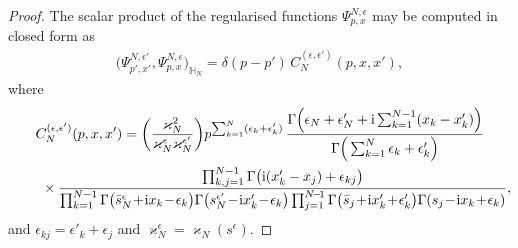 \begin{proof}
The scalar product of the regularised functions $\Psi^{N,\epsilon}_{p,{x}}$ may be computed in closed form as~\cite{Derkachov:2002tf}
\begin{gather*}
\big(\Psi^{N,\epsilon'}_{p',{x}'},\Psi^{N,\epsilon}_{p,{x}}\big)_{\mathbb H_N}=\delta(p-p') \, C_N^{(\epsilon, \epsilon')}(p, x, x'),
\end{gather*}
where
\begin{gather}
C_N^{( \epsilon, \epsilon')}(p, x, x') =\bigg(\frac{\varkappa_N^2}{\varkappa^{\epsilon}_N\varkappa^{\epsilon'}_N}\bigg)
p^{\sum_{k=1}^N(\epsilon_k+\epsilon'_k)} \,
\frac{\Gamma\Big(\epsilon_N+\epsilon'_N+{\rm i}\sum_{k=1}^{N-1}(x_k-x'_k)\Big)} {\Gamma\Big(\sum_{k=1}^N\epsilon_k+\epsilon'_k\Big)}\nonumber
\\ \qquad\
{}\times \frac{\prod_{k,j=1}^{N-1}\Gamma\big({\rm i}(x'_k-x_j)+\epsilon_{kj}\big)}
{\prod_{k=1}^{N-1}\Gamma\big( \bar s^\epsilon_N\!+\!{\rm i}x_k\!-\!\epsilon_k\big)
\Gamma\big(s_N^{\epsilon'}\!-\!{\rm i}x'_k\!-\!\epsilon_k\big)\prod_{j=1}^{N\!-\!1}
\Gamma\big( \bar s_j\!+\!{\rm i}x'_k\!+\!\epsilon'_k\big)
\Gamma(s_j\!-\!{\rm i}x_k\!+\!\epsilon_k)},\label{CNresult}
\end{gather}
and
$\epsilon_{kj}=\epsilon'_k+\epsilon_j$ and $\varkappa^{\epsilon}_N=\varkappa_N(
s^{\epsilon})$.


\end{proof}
